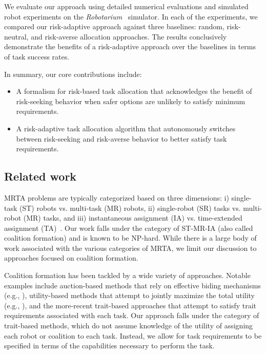 \documentclass[letterpaper, 10 pt, conference]{ieeeconf}  %
\begin{document}
We evaluate our approach using detailed numerical evaluations and simulated robot experiments on the \emph{Robotarium}~\cite{wilson2020} simulator. In each of the experiments, we compared our risk-adaptive approach against three baselines: random, risk-neutral, and risk-averse allocation approaches. The results conclusively demonstrate the benefits of a risk-adaptive approach over the baselines in terms of task success rates.

In summary, our core contributions include:
\begin{itemize}
    \item A formalism for risk-based task allocation that acknowledges the benefit of risk-seeking behavior when safer options are unlikely to satisfy minimum requirements.
    \item A risk-adaptive task allocation algorithm that autonomously switches between risk-seeking and risk-averse behavior to better satisfy task requirements.
\end{itemize}

\subsection*{Related work}

MRTA problems are typically categorized based on three dimensions: i) single-task (ST) robots vs. multi-task (MR) robots, ii) single-robot (SR) tasks vs. multi-robot (MR) tasks, and iii) instantaneous assignment (IA) vs. time-extended assignment (TA)~\cite{gerkey2004,korsah2013comprehensive}. Our work falls under the category of ST-MR-IA (also called coalition formation) and is known to be NP-hard. While there is a large body of work associated with the various categories of MRTA, we limit our discussion to approaches focused on coalition formation.

Coalition formation has been tackled by a wide variety of approaches. Notable examples include auction-based methods that rely on effective biding mechanisms (e.g., \cite{guerrero2003multi,xie2018mutual}), utility-based methods that attempt to jointly maximize the total utility (e.g., \cite{vig2006multi,parker2006building}), and the more-recent trait-based approaches that attempt to satisfy trait requirements associated with each task. Our approach falls under the category of trait-based methods, which do not assume knowledge of the utility of assigning each robot or coalition to each task. Instead, we allow for task requirements to be specified in terms of the capabilities necessary to perform the task. 
\end{document}
